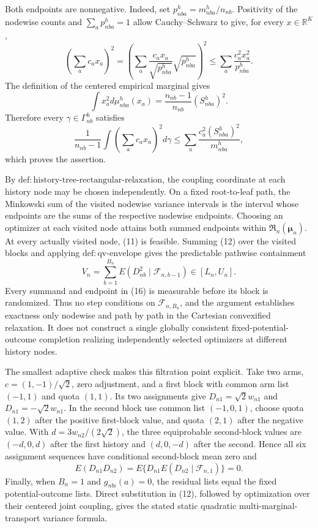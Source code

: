 Both endpoints are nonnegative. Indeed, set \(p_{nba}^h=m_{nba}^h/n_{nb}\). Positivity of the nodewise counts and \(\sum_ap_{nba}^h=1\) allow Cauchy--Schwarz to give, for every \(x\in\mathbb R^K\),
\[
\left(\sum_ac_ax_a\right)^2
=\left(\sum_a\frac{c_ax_a}{\sqrt{p_{nba}^h}}\sqrt{p_{nba}^h}\right)^2
\le\sum_a\frac{c_a^2x_a^2}{p_{nba}^h}.
\tag{13}
\]
The definition of the centered empirical marginal gives
\[
\int x_a^2d\mu_{nba}^h(x_a)
=\frac{n_{nb}-1}{n_{nb}}(S_{nba}^h)^2.
\tag{14}
\]
Therefore every \(\gamma\in\Gamma_{nb}^h\) satisfies
\[
\frac1{n_{nb}-1}\int\left(\sum_ac_ax_a\right)^2d\gamma
\le\sum_a\frac{c_a^2(S_{nba}^h)^2}{m_{nba}^h},
\tag{15}
\]
which proves the assertion.

By \(\mathrm{def:history\text{-}tree\text{-}rectangular\text{-}relaxation}\), the coupling coordinate at each history node may be chosen independently. On a fixed root-to-leaf path, the Minkowski sum of the visited nodewise variance intervals is the interval whose endpoints are the sums of the respective nodewise endpoints. Choosing an optimizer at each visited node attains both summed endpoints within \(\mathfrak R_n(\boldsymbol\mu_n)\). At every actually visited node, (11) is feasible. Summing (12) over the visited blocks and applying \(\mathrm{def:qv\text{-}envelope}\) gives the predictable pathwise containment
\[
V_n=\sum_{b=1}^{B_n}E(D_{nb}^2\mid\mathcal F_{n,b-1})\in[L_n,U_n].
\tag{16}
\]
Every summand and endpoint in (16) is measurable before its block is randomized. Thus no step conditions on \(\mathcal F_{n,B_n}\), and the argument establishes exactness only nodewise and path by path in the Cartesian convexified relaxation. It does not construct a single globally consistent fixed-potential-outcome completion realizing independently selected optimizers at different history nodes.

The smallest adaptive check makes this filtration point explicit. Take two arms, \(c=(1,-1)/\sqrt2\), zero adjustment, and a first block with common arm list \((-1,1)\) and quota \((1,1)\). Its two assignments give \(D_{n1}=\sqrt2w_{n1}\) and \(D_{n1}=-\sqrt2w_{n1}\). In the second block use common list \((-1,0,1)\), choose quota \((1,2)\) after the positive first-block value, and quota \((2,1)\) after the negative value. With \(d=3w_{n2}/(2\sqrt2)\), the three equiprobable second-block values are \((-d,0,d)\) after the first history and \((d,0,-d)\) after the second. Hence all six assignment sequences have conditional second-block mean zero and
\[
E(D_{n1}D_{n2})
=E\{D_{n1}E(D_{n2}\mid\mathcal F_{n,1})\}=0.
\tag{17}
\]
Finally, when \(B_n=1\) and \(g_{nbi}(a)=0\), the residual lists equal the fixed potential-outcome lists. Direct substitution in (12), followed by optimization over their centered joint coupling, gives the stated static quadratic multi-marginal-transport variance formula.